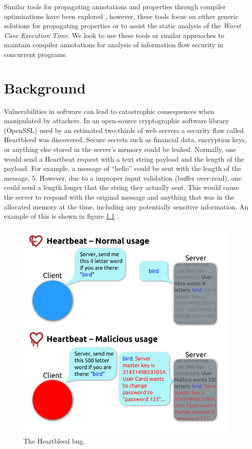 \documentclass[twocolumn]{article}
\begin{document}
Similar tools for propagating annotations and properties through compiler optimisations have been explored \cite{vu2020secure} \cite{schommer2018embedded} \cite{leroy2016compcert}, however, these tools focus on either generic solutions for propagating properties or to assist the static analysis of the \textit{Worst Case Execution Time}. We look to use these tools or similar approaches to maintain compiler annotations for analysis of information flow security in concurrent programs.

\chapter{Background}
Vulnerabilities in software can lead to catastrophic consequences when manipulated by attackers. In an open-source cryptographic software library (OpenSSL) used by an estimated two-thirds of web servers \cite{heartbleed} a security flaw called Heartbleed was discovered. Secure secrets such as financial data, encryption keys, or anything else stored in the server's memory could be leaked. Normally, one would send a Heartbeat request with a text string payload and the length of the payload. For example, a message of ``hello'' could be sent with the length of the message, 5. However, due to a improper input validation (buffer over-read), one could send a length longer that the string they actually sent. This would cause the server to respond with the original message and anything that was in the allocated memory at the time, including any potentially sensitive information. An example of this is shown in figure \ref{fig:heartbleed} \cite{heartbleedimg}.

\begin{figure}
    \centering
    \includegraphics[width=\linewidth]{heartbleed.png}
    \caption{The Heartbleed bug. \cite{heartbleedimg}}
    \label{fig:heartbleed}
\end{figure}
\end{document}
